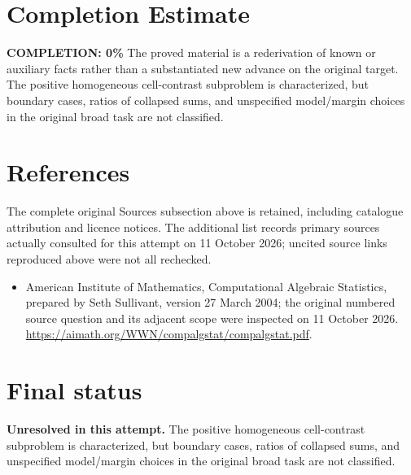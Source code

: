 \documentclass[11pt]{article}
\begin{document}
\section{Completion Estimate}
\noindent\textbf{COMPLETION: 0\%}
The proved material is a rederivation of known or auxiliary facts rather than a substantiated new advance on the original target. The positive homogeneous cell-contrast subproblem is characterized, but boundary cases, ratios of collapsed sums, and unspecified model/margin choices in the original broad task are not classified.
\section{References}
The complete original Sources subsection above is retained, including catalogue attribution and licence notices. The additional list records primary sources actually consulted for this attempt on 11 October 2026; uncited source links reproduced above were not all rechecked.
\begin{itemize}
\item American Institute of Mathematics, Computational Algebraic Statistics, prepared by Seth Sullivant, version 27 March 2004; the original numbered source question and its adjacent scope were inspected on 11 October 2026. \url{https://aimath.org/WWN/compalgstat/compalgstat.pdf}.
\end{itemize}
\section{Final status}
\textbf{Unresolved in this attempt.} The positive homogeneous cell-contrast subproblem is characterized, but boundary cases, ratios of collapsed sums, and unspecified model/margin choices in the original broad task are not classified.
\end{document}
